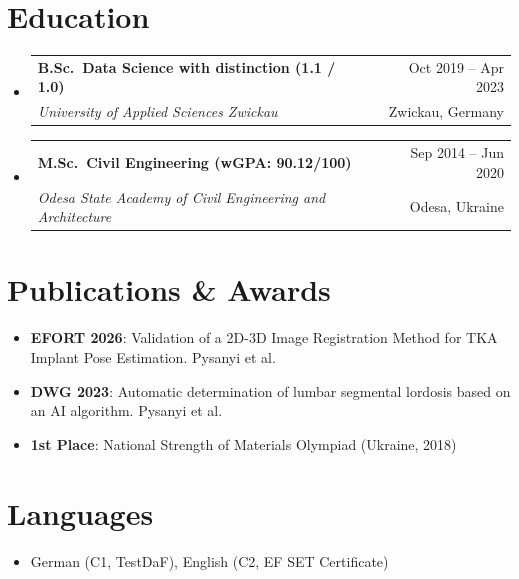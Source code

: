 \documentclass[letterpaper,10pt]{article}
\makeatletter
\newcommand{\resumeItem}[1]{
    \item\small{#1}\vspace{-0.5pt}
}
\newcommand{\resumeSubheading}[4]{
\vspace{2pt}\item
  \begin{tabular*}{0.97\textwidth}[t]{l@{\extracolsep{\fill}}r}
    \textbf{#1} & #2 \\
    \textit{{#3}} & {#4} \\
  \end{tabular*}\vspace{-0pt}
}
\newcommand{\resumeSubHeadingList}{\begin{itemize}[leftmargin=0.15in, label={}]\vspace{-2pt}}
\newcommand{\resumeSubHeadingListEnd}{\end{itemize}}
\makeatother
\begin{document}
\section{Education}
\resumeSubHeadingList
  \resumeSubheading
      {B.Sc.\ Data Science with distinction (1.1 / 1.0)}{Oct 2019 -- Apr 2023}
      {University of Applied Sciences Zwickau}{Zwickau, Germany}
\vspace{-2pt}
  \resumeSubheading
      {M.Sc.\ Civil Engineering (wGPA: 90.12/100)}{Sep 2014 -- Jun 2020}
      {Odesa State Academy of Civil Engineering and Architecture}{Odesa, Ukraine}
\resumeSubHeadingListEnd

\section{Publications \& Awards}
\resumeSubHeadingList
  \resumeItem{\textbf{EFORT 2026}: Validation of a 2D-3D Image Registration Method for TKA Implant Pose Estimation. Pysanyi et al.}
  \resumeItem{\textbf{DWG 2023}: Automatic determination of lumbar segmental lordosis based on an AI algorithm. Pysanyi et al.}
  \resumeItem{\textbf{1st Place}: National Strength of Materials Olympiad (Ukraine, 2018)}
\resumeSubHeadingListEnd

\section{Languages}
\resumeSubHeadingList
  \resumeItem{German (C1, TestDaF), English (C2, EF SET Certificate)}
\resumeSubHeadingListEnd
\end{document}
